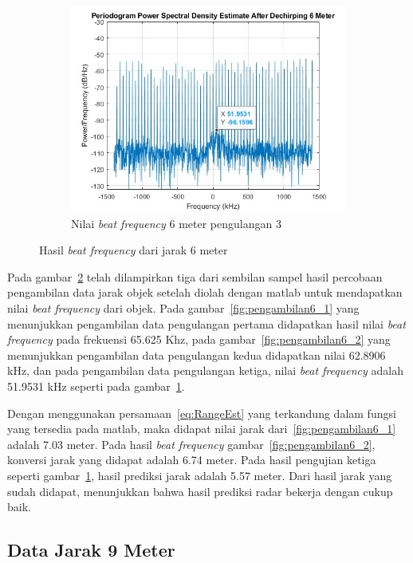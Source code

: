\begin{figure}
\begin{subfigure}[b]{0.6\textwidth}
        \centering
		\includegraphics[scale=0.35]{pics/bab5/Range/3_6.jpg}
		\caption{Nilai \textit{beat frequency} 6 meter pengulangan 3}
		\label{fig:pengambilan6_3}
    \end{subfigure}
    \caption{Hasil \textit{beat frequency} dari jarak 6 meter}
    \label{fig:pengambilan6}
\end{figure}

Pada gambar~\ref{fig:pengambilan6} telah dilampirkan tiga dari sembilan sampel hasil percobaan pengambilan data jarak objek setelah diolah dengan matlab untuk mendapatkan nilai \textit{beat frequency} dari objek. Pada gambar~\ref{fig:pengambilan6_1} yang menunjukkan pengambilan data pengulangan pertama didapatkan hasil nilai \textit{beat frequency} pada frekuensi 65.625 Khz, pada gambar~\ref{fig:pengambilan6_2} yang menunjukkan pengambilan data pengulangan kedua didapatkan nilai 62.8906 kHz, dan pada pengambilan data pengulangan ketiga, nilai \textit{beat frequency} adalah 51.9531 kHz seperti pada gambar~\ref{fig:pengambilan6_3}.

Dengan menggunakan persamaan~\ref{eq:RangeEst} yang terkandung dalam fungsi yang tersedia pada matlab, maka didapat nilai jarak dari~\ref{fig:pengambilan6_1} adalah 7.03 meter. Pada hasil \textit{beat frequency} gambar~\ref{fig:pengambilan6_2}, konversi jarak yang didapat adalah 6.74 meter. Pada hasil pengujian ketiga seperti gambar~\ref{fig:pengambilan6_3}, hasil prediksi jarak adalah 5.57 meter. Dari hasil jarak yang sudah didapat, menunjukkan bahwa hasil prediksi radar bekerja dengan cukup baik. 

\subsection{Data Jarak 9 Meter}

